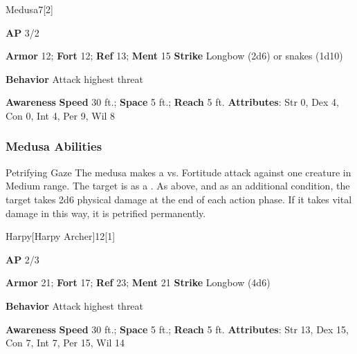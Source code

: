 \begin{monsection}{Medusa}{7}[2]
\vspace{-1em}\vspace{-1em}
\begin{spellcontent}
\begin{spelltargetinginfo}
{\textbf{AP} 3/2}

\pari \textbf{Armor} 12;
\textbf{Fort} 12;
\textbf{Ref} 13;
\textbf{Ment} 15
\pari \textbf{Strike} Longbow  (2d6) or snakes  (1d10)



\pari \textbf{Behavior} Attack highest threat
\end{spelltargetinginfo}
\end{spellcontent}

\begin{monsterfooter}
\pari \textbf{Awareness} 
\pari \textbf{Speed} 30 ft.;
\textbf{Space} 5 ft.;
\textbf{Reach} 5 ft.
\pari \textbf{Attributes}:
Str 0,
Dex 4,
Con 0,
Int 4,
Per 9,
Wil 8
\end{monsterfooter}
\end{monsection}


\subsubsection{Medusa Abilities}

\begin{freeability}{Petrifying Gaze}
The medusa makes a  vs. Fortitude attack against one creature in Medium range.
\hit The target is  as a .
\crit As above, and as an additional condition, the target takes 2d6 physical damage at the end of each action phase.
If it takes vital damage in this way, it is petrified permanently.
\end{freeability}

\begin{monsection}{Harpy}[Harpy Archer]{12}[1]
\vspace{-1em}\vspace{-1em}
\begin{spellcontent}
\begin{spelltargetinginfo}
{\textbf{AP} 2/3}

\pari \textbf{Armor} 21;
\textbf{Fort} 17;
\textbf{Ref} 23;
\textbf{Ment} 21
\pari \textbf{Strike} Longbow  (4d6)



\pari \textbf{Behavior} Attack highest threat
\end{spelltargetinginfo}
\end{spellcontent}

\begin{monsterfooter}
\pari \textbf{Awareness} 
\pari \textbf{Speed} 30 ft.;
\textbf{Space} 5 ft.;
\textbf{Reach} 5 ft.
\pari \textbf{Attributes}:
Str 13,
Dex 15,
Con 7,
Int 7,
Per 15,
Wil 14
\end{monsterfooter}
\end{monsection}

